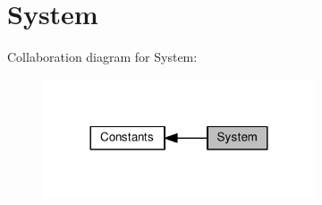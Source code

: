 \hypertarget{group__IL__CONST__SYS}{}\section{System}
\label{group__IL__CONST__SYS}
Collaboration diagram for System\+:\nopagebreak
\begin{figure}[H]
\begin{center}
\leavevmode
\includegraphics[width=228pt]{group__IL__CONST__SYS}
\end{center}
\end{figure}

